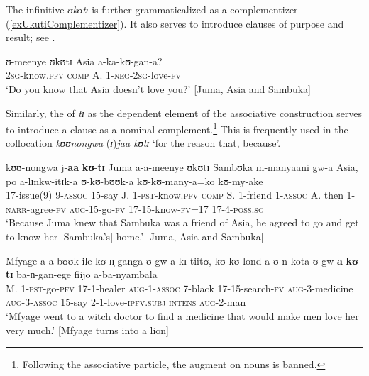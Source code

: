 The infinitive \textit{ʊkʊtɪ} is further grammaticalized as a complementizer (\ref{exUkutiComplementizer}). It also serves to introduce clauses of purpose and result; see .
\begin{exe}
\ex\label{exUkutiComplementizer}
\gll ʊ-meenye ʊkʊtɪ Asia a-ka-kʊ-gan-a?\\
\textsc{2sg}-know.\textsc{pfv} \textsc{comp} A. 1-\textsc{neg}-\textsc{2sg}-love-\textsc{fv}\\
\glt `Do you know that Asia doesn't love you?' [Juma, Asia and Sambuka]
\end{exe}

Similarly, the  of \textit{tɪ} as the dependent element of the associative construction serves to introduce a clause as a nominal complement.\footnote{Following the associative particle, the augment on nouns is banned.} This is frequently used in the collocation \textit{kʊʊnongwa} (\textit{ɪ})\textit{jaa kʊtɪ} `for the reason that, because'.

\begin{exe}
\ex \label{exkunongwajaa} \gll kʊʊ-nongwa j-\textbf{aa} \textbf{kʊ}-\textbf{tɪ} Juma a-a-meenye ʊkʊtɪ Sambʊka m-manyaani gw-a Asia, po a-lɪnkw-itɪk-a ʊ-kʊ-bʊʊk-a kʊ-kʊ-many-a=ko kʊ-my-ake\\
17-issue(9) 9-\textsc{assoc} 15-say J. 1-\textsc{pst}-know.\textsc{pfv} \textsc{comp} S. 1-friend 1-\textsc{assoc} A. then 1-\textsc{narr}-agree-\textsc{fv} \textsc{aug}-15-go-\textsc{fv} 17-15-know-\textsc{fv}=17 17-4-\textsc{poss.sg}\\
\glt `Because Juma knew that Sambuka was a friend of Asia, he agreed to go and get to know her [Sambuka's] home.' [Juma, Asia and Sambuka]

\ex \gll Mfyage a-a-bʊʊk-ile kʊ-n̩-ganga ʊ-gw-a kɪ-tiitʊ, kʊ-kʊ-lond-a ʊ-n-kota ʊ-gw-\textbf{a} \textbf{kʊ}-\textbf{tɪ} ba-n̩-gan-ege fiijo a-ba-nyambala\\
M. 1-\textsc{pst}-go-\textsc{pfv} 17-1-healer \textsc{aug}-1-\textsc{assoc} 7-black 17-15-search-\textsc{fv} \textsc{aug}-3-medicine \textsc{aug}-3-\textsc{assoc} 15-say 2-1-love-\textsc{ipfv.subj} \textsc{intens} \textsc{aug}-2-man\\
\glt `Mfyage went to a witch doctor to find a medicine that would make men love her very much.' [Mfyage turns into a lion] 
\end{exe}

